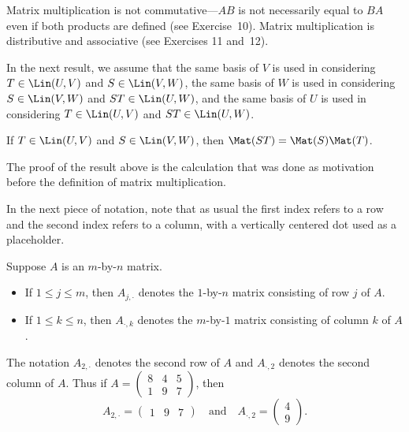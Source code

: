 Matrix multiplication is not commutative---$AB$ is not necessarily equal to
$BA$ even if both products are defined (see Exercise~10). Matrix multiplication
is distributive and associative (see Exercises 11 and~12).

In the next result, we assume that the same basis of $V$ is used in considering
$T\in\Lin(U,V)$ and $S\in\Lin(V,W)$, the same basis of $W$ is used in
considering $S\in\Lin(V,W)$ and $ST\in\Lin(U,W)$, and the same basis of $U$ is
used in considering $T\in\Lin(U,V)$ and $ST\in\Lin(U,W)$.

\begin{result}\label{ax:3.43}
If $T\in\Lin(U,V)$ and $S\in\Lin(V,W)$, then $\Mat(ST)=\Mat(S)\Mat(T)$.
\end{result}

The proof of the result above is the calculation that was done as motivation
before the definition of matrix multiplication.

In the next piece of notation, note that as usual the first index refers to a
row and the second index refers to a column, with a vertically centered dot
used as a placeholder.

\begin{notation}\label{ax:3.44}
Suppose $A$ is an $m$-by-$n$ matrix.
\begin{itemize}
\item If $1\le j\le m$, then $A_{j,\cdot}$ denotes the $1$-by-$n$ matrix
  consisting of row $j$ of $A$.
\item If $1\le k\le n$, then $A_{\cdot,k}$ denotes the $m$-by-$1$ matrix
  consisting of column $k$ of $A$.
\end{itemize}
\end{notation}

\begin{example}\label{ax:3.45}
The notation $A_{2,\cdot}$ denotes the second row of $A$ and $A_{\cdot,2}$
denotes the second column of $A$. Thus if
$A=\begin{pmatrix} 8 & 4 & 5\\ 1 & 9 & 7 \end{pmatrix}$, then
\[ A_{2,\cdot} = \begin{pmatrix} 1 & 9 & 7 \end{pmatrix}
   \quad\text{and}\quad
   A_{\cdot,2} = \begin{pmatrix} 4\\ 9 \end{pmatrix}. \]
\end{example}

